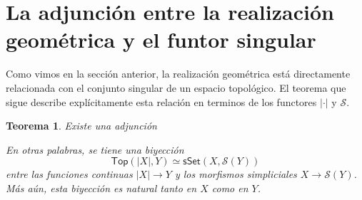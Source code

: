 \documentclass[11pt]{report}
\theoremstyle{colored}
\newtheorem{theorem}{Teorema}[section]
\newcommand{\cat}[1]{\mathsf{#1}}
\begin{document}
\section{La adjunción entre la realización geométrica y el funtor singular}

Como vimos en la sección anterior, la realización geométrica está directamente relacionada con el conjunto singular de un espacio topológico. El teorema que sigue describe explícitamente esta relación en terminos de los functores $| \cdot |$ y $\mathcal{S}$.

\begin{theorem} Existe una adjunción
\begin{center}
\end{center}
En otras palabras, se tiene una biyección
\[
\cat{Top}(|X|,Y) \simeq \cat{sSet}(X,\mathcal{S}(Y))
\]
entre las funciones continuas $|X| \to Y$ y los morfismos simpliciales $X \to \mathcal{S}(Y)$. Más aún, esta biyección es natural tanto en $X$ como en $Y$.
\end{theorem}
\end{document}
